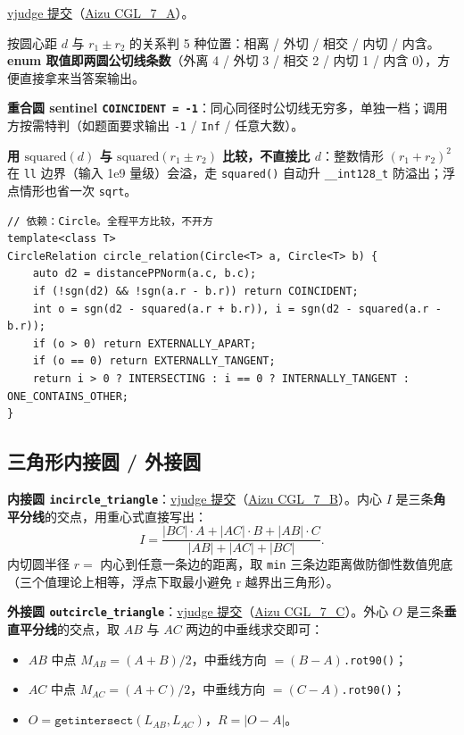 		\href{https://vjudge.net/solution/69918813}{vjudge 提交}（\href{https://vjudge.net/problem/Aizu-CGL_7_A}{Aizu CGL\_7\_A}）。

		按圆心距 $d$ 与 $r_1 \pm r_2$ 的关系判 5 种位置：相离 / 外切 / 相交 / 内切 / 内含。\textbf{enum 取值即两圆公切线条数}（外离 4 / 外切 3 / 相交 2 / 内切 1 / 内含 0），方便直接拿来当答案输出。

		\textbf{重合圆 sentinel \texttt{COINCIDENT = -1}}：同心同径时公切线无穷多，单独一档；调用方按需特判（如题面要求输出 \texttt{-1} / \texttt{Inf} / 任意大数）。

		\textbf{用 $\mathrm{squared}(d)$ 与 $\mathrm{squared}(r_1 \pm r_2)$ 比较，不直接比 $d$}：整数情形 $(r_1 + r_2)^2$ 在 \texttt{ll} 边界（输入 1e9 量级）会溢，走 \texttt{squared()} 自动升 \texttt{\_\_int128\_t} 防溢出；浮点情形也省一次 \texttt{sqrt}。

\begin{verbatim}
// 依赖：Circle。全程平方比较，不开方
template<class T>
CircleRelation circle_relation(Circle<T> a, Circle<T> b) {
	auto d2 = distancePPNorm(a.c, b.c);
	if (!sgn(d2) && !sgn(a.r - b.r)) return COINCIDENT;
	int o = sgn(d2 - squared(a.r + b.r)), i = sgn(d2 - squared(a.r - b.r));
	if (o > 0) return EXTERNALLY_APART;
	if (o == 0) return EXTERNALLY_TANGENT;
	return i > 0 ? INTERSECTING : i == 0 ? INTERNALLY_TANGENT : ONE_CONTAINS_OTHER;
}
\end{verbatim}

		\subsection{三角形内接圆 / 外接圆}

		\textbf{内接圆 \texttt{incircle\_triangle}}：\href{https://vjudge.net/solution/69920478}{vjudge 提交}（\href{https://vjudge.net/problem/Aizu-CGL_7_B}{Aizu CGL\_7\_B}）。内心 $I$ 是三条\textbf{角平分线}的交点，用重心式直接写出：
		$$I = \frac{|BC| \cdot A + |AC| \cdot B + |AB| \cdot C}{|AB| + |AC| + |BC|}.$$
		内切圆半径 $r = $ 内心到任意一条边的距离，取 \texttt{min} 三条边距离做防御性数值兜底（三个值理论上相等，浮点下取最小避免 r 越界出三角形）。

		\textbf{外接圆 \texttt{outcircle\_triangle}}：\href{https://vjudge.net/solution/69927652}{vjudge 提交}（\href{https://vjudge.net/problem/Aizu-CGL_7_C}{Aizu CGL\_7\_C}）。外心 $O$ 是三条\textbf{垂直平分线}的交点，取 $AB$ 与 $AC$ 两边的中垂线求交即可：
		\begin{itemize}
			\setlength\itemsep{0pt}
			\item $AB$ 中点 $M_{AB} = (A + B) / 2$，中垂线方向 $= (B - A)$\texttt{.rot90()}；
			\item $AC$ 中点 $M_{AC} = (A + C) / 2$，中垂线方向 $= (C - A)$\texttt{.rot90()}；
			\item $O = \texttt{getintersect}(L_{AB}, L_{AC})$，$R = |O - A|$。
		\end{itemize}

